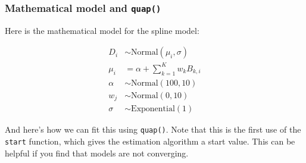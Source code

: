 \documentclass[
]{book}
\newenvironment{Shaded}{\begin{snugshade}}{\end{snugshade}}
\newcommand{\AttributeTok}[1]{\textcolor[rgb]{0.13,0.29,0.53}{#1}}
\newcommand{\DecValTok}[1]{\textcolor[rgb]{0.00,0.00,0.81}{#1}}
\newcommand{\FunctionTok}[1]{\textcolor[rgb]{0.13,0.29,0.53}{\textbf{#1}}}
\newcommand{\NormalTok}[1]{#1}
\newcommand{\OtherTok}[1]{\textcolor[rgb]{0.56,0.35,0.01}{#1}}
\newcommand{\SpecialCharTok}[1]{\textcolor[rgb]{0.81,0.36,0.00}{\textbf{#1}}}
\begin{document}
\subsubsection{\texorpdfstring{Mathematical model and \texttt{quap()}}{Mathematical model and quap()}}\label{mathematical-model-and-quap}

Here is the mathematical model for the spline model:

\begin{align*}
D_i &\sim \text{Normal}(\mu_i,\sigma) \\
\mu_i &= \alpha + \sum^K_{k=1} w_k B_{k,i} \\
\alpha &\sim \text{Normal}(100,10) \\
w_j &\sim \text{Normal}(0,10) \\
\sigma &\sim \text{Exponential}(1)
\end{align*}

And here's how we can fit this using \texttt{quap()}. Note that this is the first use of the \texttt{start} function, which gives the estimation algorithm a start value. This can be helpful if you find that models are not converging.

\begin{Shaded}
\end{Shaded}
\end{document}

